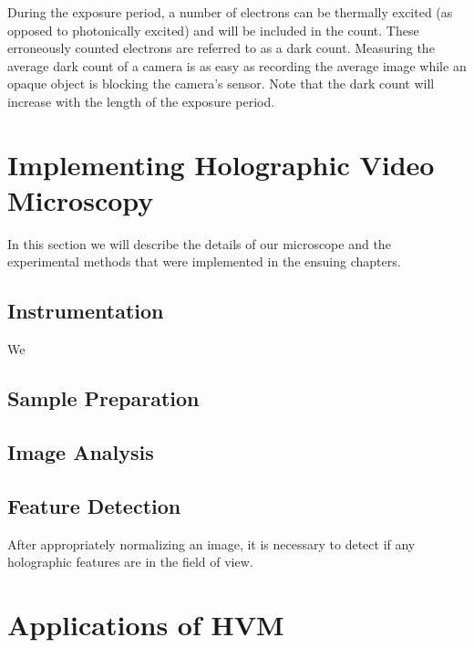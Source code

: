 During the exposure period, a number of electrons can be thermally excited (as opposed to
photonically excited) and will be included in the count. These erroneously
counted electrons are referred to as a dark count. Measuring the average dark count of a
camera is as easy as recording the average image while an opaque object is blocking the
camera's sensor. Note that the dark count will increase with the length of the exposure
period.




\section{Implementing Holographic Video Microscopy}

In this section we will describe the details of our microscope and
the experimental methods that were implemented in the ensuing chapters.



\subsection{Instrumentation}

We


\subsection{Sample Preparation}




\subsection{Image Analysis}


\subsection{Feature Detection}

After appropriately normalizing an image, it is necessary to detect if any holographic
features are in the field of view. 


\section{Applications of HVM}

